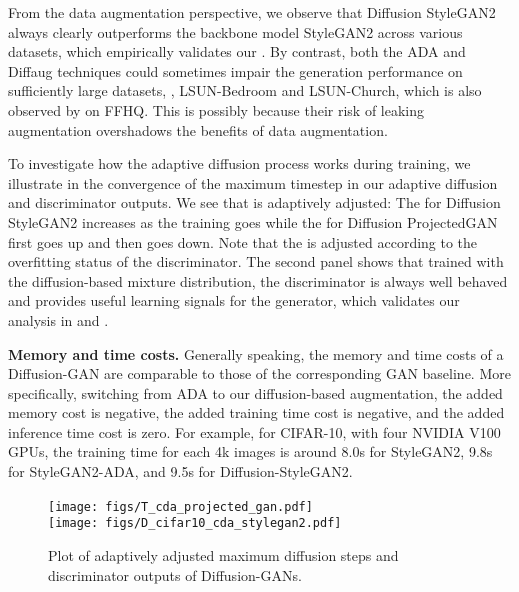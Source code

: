 \documentclass{article} \usepackage{iclr2023_conference,times}
\theoremstyle{plain}
\theoremstyle{definition}
\theoremstyle{remark}
\begin{document}
From the data augmentation perspective, we observe that Diffusion StyleGAN2 always clearly outperforms the backbone model StyleGAN2 across various datasets, which empirically validates our . By contrast, both the ADA \citep{karras2020analyzing} and Diffaug \citep{zhao2020differentiable} techniques could sometimes impair the generation performance on sufficiently large datasets, , LSUN-Bedroom and LSUN-Church, which is also observed by \citet{yang2021data} on FFHQ. This is possibly because their risk of leaking augmentation overshadows the benefits of data augmentation.


To investigate how the adaptive diffusion process works during training, we illustrate in  the convergence of the maximum timestep  in our adaptive diffusion and discriminator outputs. We see that  is adaptively adjusted: The  for Diffusion StyleGAN2 increases as the training goes while the  for Diffusion ProjectedGAN first goes up and then goes down. Note that the  is adjusted according to the overfitting status of the discriminator. The second panel shows that trained with the diffusion-based mixture distribution, the discriminator is always well behaved and provides useful learning signals for the generator, which validates our analysis in  and . 

{\textbf{Memory and time costs. } Generally speaking, the memory and time costs of a Diffusion-GAN are comparable to those of the corresponding GAN baseline. More specifically, switching from ADA  \citep{karras2020training} to our diffusion-based augmentation, the added memory cost is negative, the added training time cost is negative, and the added inference time cost is zero. For example, for CIFAR-10, with four NVIDIA V100 GPUs, the training time for each 4k images is around 8.0s for StyleGAN2, 9.8s for StyleGAN2-ADA, and 9.5s for Diffusion-StyleGAN2.}


\begin{figure}[t]
    \centering
\texttt{[image: figs/T\_cda\_projected\_gan.pdf]} ~~~~~~~~~~~~~~~
    \texttt{[image: figs/D\_cifar10\_cda\_stylegan2.pdf]}
    \vspace{-1mm}
    \caption{\small Plot of adaptively adjusted maximum diffusion steps  and discriminator outputs of Diffusion-GANs.}
    \label{fig:covergence_pg}
    \vspace{-2mm}
\end{figure}
\end{document}
